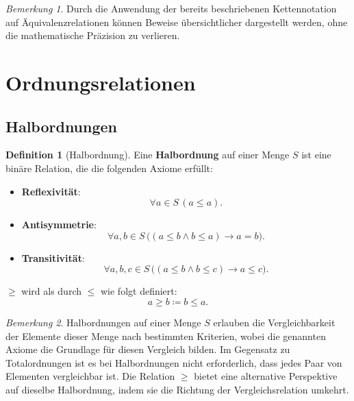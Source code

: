 \documentclass{book}
\theoremstyle{plain}
\theoremstyle{remark}
\newtheorem*{remark}{Bemerkung}
\theoremstyle{definition}
\newtheorem{definition}{Definition}[section]
\begin{document}
\begin{remark}
    Durch die Anwendung der bereits beschriebenen Kettennotation auf Äquivalenzrelationen können Beweise übersichtlicher dargestellt werden, ohne die mathematische Präzision zu verlieren.
\end{remark}

\section{Ordnungsrelationen}

\subsection{Halbordnungen}

\begin{definition}[Halbordnung]
    Eine \textbf{Halbordnung} auf einer Menge \( S \) ist eine binäre Relation, die die folgenden Axiome erfüllt:

    \begin{itemize}
        \item \textbf{Reflexivität}:
        \[
        \forall a \in S \, (a \leq a).
        \]
        
        \item \textbf{Antisymmetrie}: 
        \[
        \forall a, b \in S \, \big( (a \leq b \land b \leq a) \rightarrow a = b \big).
        \]
        
        \item \textbf{Transitivität}: 
        \[
        \forall a, b, c \in S \, \big( (a \leq b \land b \leq c) \rightarrow a \leq c \big).
        \]
    \end{itemize}

    \(\geq\) wird als durch \(\leq\) wie folgt definiert:
    \[
    a \geq b \coloneqq b \leq a.
    \]
\end{definition}

\begin{remark}
    Halbordnungen auf einer Menge \( S \) erlauben die Vergleichbarkeit der Elemente dieser Menge nach bestimmten Kriterien, wobei die genannten Axiome die Grundlage für diesen Vergleich bilden. Im Gegensatz zu Totalordnungen ist es bei Halbordnungen nicht erforderlich, dass jedes Paar von Elementen vergleichbar ist. Die Relation \(\geq\) bietet eine alternative Perspektive auf dieselbe Halbordnung, indem sie die Richtung der Vergleichsrelation umkehrt.
\end{remark}
\end{document}
